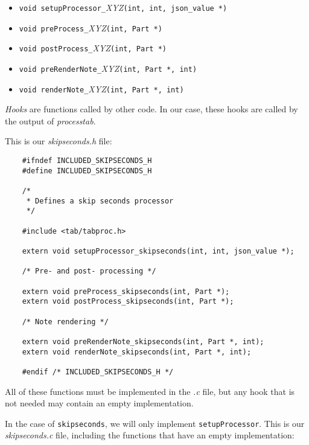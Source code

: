 \documentclass{article}
\begin{document}
\begin{itemize}
\item \verb!void setupProcessor_!{\it XYZ}\verb!(int, int, json_value *)!
\item \verb!void preProcess_!{\it XYZ}\verb!(int, Part *)!
\item \verb!void postProcess_!{\it XYZ}\verb!(int, Part *)!
\item \verb!void preRenderNote_!{\it XYZ}\verb!(int, Part *, int)!
\item \verb!void renderNote_!{\it XYZ}\verb!(int, Part *, int)!
\end{itemize}

{\it Hooks} are functions called by other code.  In our case, these hooks are
called by the output of {\it processtab}.

This is our {\it skipseconds.h} file:

\begin{verbatim}
	#ifndef INCLUDED_SKIPSECONDS_H
	#define INCLUDED_SKIPSECONDS_H

	/*
	 * Defines a skip seconds processor
	 */

	#include <tab/tabproc.h>

	extern void setupProcessor_skipseconds(int, int, json_value *);

	/* Pre- and post- processing */

	extern void preProcess_skipseconds(int, Part *);
	extern void postProcess_skipseconds(int, Part *);
		
	/* Note rendering */
		
	extern void preRenderNote_skipseconds(int, Part *, int);
	extern void renderNote_skipseconds(int, Part *, int);

	#endif /* INCLUDED_SKIPSECONDS_H */
\end{verbatim}

All of these functions must be implemented in the {\it .c} file, but any hook
that is not needed may contain an empty implementation.

In the case of \verb!skipseconds!, we will only implement \verb!setupProcessor!.
This is our {\it skipseconds.c} file, including the functions that have an empty
implementation:
\end{document}
